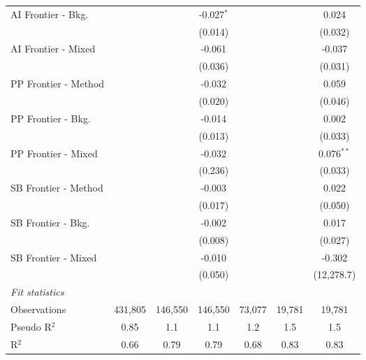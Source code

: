 \begin{tabular}{lcccccc}
   AI Frontier - Bkg.   &                &                & -0.027$^{*}$   &                &              & 0.024\\   
                        &                &                & (0.014)        &                &              & (0.032)\\   
   AI Frontier - Mixed  &                &                & -0.061         &                &              & -0.037\\   
                        &                &                & (0.036)        &                &              & (0.031)\\   
   PP Frontier - Method &                &                & -0.032         &                &              & 0.059\\   
                        &                &                & (0.020)        &                &              & (0.046)\\   
   PP Frontier - Bkg.   &                &                & -0.014         &                &              & 0.002\\   
                        &                &                & (0.013)        &                &              & (0.033)\\   
   PP Frontier - Mixed  &                &                & -0.032         &                &              & 0.076$^{**}$\\   
                        &                &                & (0.236)        &                &              & (0.033)\\   
   SB Frontier - Method &                &                & -0.003         &                &              & 0.022\\   
                        &                &                & (0.017)        &                &              & (0.050)\\   
   SB Frontier - Bkg.   &                &                & -0.002         &                &              & 0.017\\   
                        &                &                & (0.008)        &                &              & (0.027)\\   
   SB Frontier - Mixed  &                &                & -0.010         &                &              & -0.302\\   
                        &                &                & (0.050)        &                &              & (12,278.7)\\   
   \midrule
   \emph{Fit statistics}\\
   Observations         & 431,805        & 146,550        & 146,550        & 73,077         & 19,781       & 19,781\\  
   Pseudo R$^2$         & 0.85           & 1.1            & 1.1            & 1.2            & 1.5          & 1.5\\  
   R$^2$                & 0.66           & 0.79           & 0.79           & 0.68           & 0.83         & 0.83\\  
   

\end{tabular}
